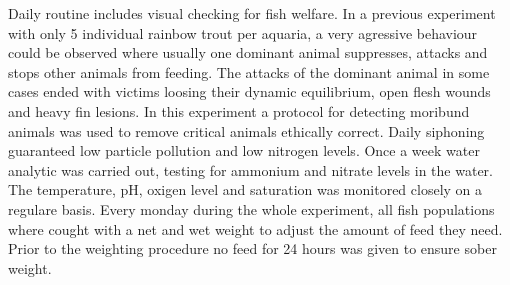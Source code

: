 Daily routine includes visual checking for fish welfare. In a previous experiment
with only 5 individual rainbow trout per aquaria, a very agressive behaviour 
could be observed where usually one dominant animal suppresses, attacks and stops
other animals from feeding. The attacks of the dominant animal in some cases ended
with victims loosing their dynamic equilibrium, open flesh wounds and heavy
fin lesions. In this experiment a protocol for detecting moribund animals was used
to remove critical animals ethically correct. 
Daily siphoning guaranteed low particle pollution and low nitrogen levels. Once
a week water analytic was carried out, testing for ammonium and nitrate levels in
the water. The temperature, pH, oxigen level and saturation was monitored closely
on a regulare basis.
Every monday during the whole experiment, all fish populations where cought with
a net and wet weight to adjust the amount of feed they need. Prior to the weighting
procedure no feed for 24 hours was given to ensure sober weight. 




